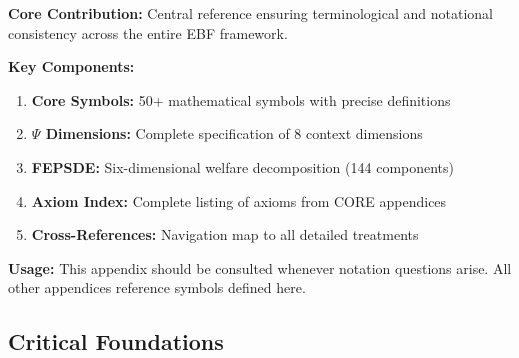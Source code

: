 \begin{tcolorbox}[colback=blue!5!white, colframe=blue!75!black,
    title=\textbf{Appendix G Summary: REF-GLOSSARY}]

\textbf{Core Contribution:}
Central reference ensuring terminological and notational consistency across
the entire EBF framework.

\textbf{Key Components:}
\begin{enumerate}[nosep]
    \item \textbf{Core Symbols:} 50+ mathematical symbols with precise definitions
    \item \textbf{$\Psi$ Dimensions:} Complete specification of 8 context dimensions
    \item \textbf{FEPSDE:} Six-dimensional welfare decomposition (144 components)
    \item \textbf{Axiom Index:} Complete listing of axioms from CORE appendices
    \item \textbf{Cross-References:} Navigation map to all detailed treatments
\end{enumerate}

\textbf{Usage:}
This appendix should be consulted whenever notation questions arise.
All other appendices reference symbols defined here.

\end{tcolorbox}


\subsection{Critical Foundations}
\label{sec:glossary-foundations}

